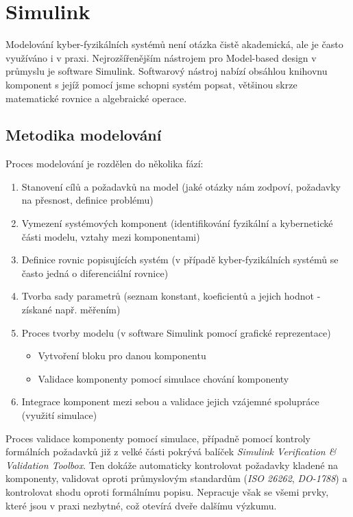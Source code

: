 \documentclass[conference,a4paper]{IEEEtran-CZ}
\begin{document}
\section{Simulink}

Modelování kyber-fyzikálních systémů není otázka čistě akademická, ale je často využíváno i v praxi.
Nejrozšířenějším nástrojem pro Model-based design v průmyslu je software Simulink. Softwarový 
nástroj nabízí obsáhlou knihovnu komponent s jejíž pomocí jsme schopni systém popsat, 
většinou skrze matematické rovnice a algebraické operace.

\subsection{Metodika modelování}

Proces modelování je rozdělen do několika fází:

\begin{enumerate}
  \item Stanovení cílů a požadavků na model (jaké otázky nám zodpoví, požadavky na přesnost, definice problému)
  \item Vymezení systémových komponent (identifikování fyzikální a kybernetické části modelu, vztahy mezi komponentami)
  \item Definice rovnic popisujících systém (v případě kyber-fyzikálních systémů se často jedná o diferenciální rovnice)
  \item Tvorba sady parametrů (seznam konstant, koeficientů a jejich hodnot - získané např. měřením)
  \item Proces tvorby modelu (v software Simulink pomocí grafické reprezentace)
 	\begin{itemize}
	  \item Vytvoření bloku pro danou komponentu
  	  \item Validace komponenty pomocí simulace chování komponenty
	\end{itemize}
  \item Integrace komponent mezi sebou a validace jejich vzájemné spolupráce (využití simulace)
\end{enumerate}

Proces validace komponenty pomocí simulace, případně pomocí kontroly formálních požadavků
již z velké části pokrývá balíček \emph{Simulink Verification \& Validation Toolbox}. Ten dokáže automaticky 
kontrolovat požadavky kladené na komponenty, validovat oproti průmyslovým standardům 
(\emph{ISO 26262}, \emph{DO-1788}) a kontrolovat shodu oproti formálnímu popisu. Nepracuje
však se všemi prvky, které jsou v praxi nezbytné, což otevírá dveře dalšímu výzkumu.
\end{document}
